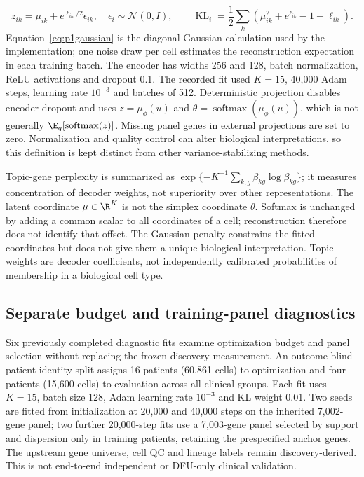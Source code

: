 \documentclass[10pt,a4paper]{article}
\begin{document}
\begin{equation}
z_{ik}=\mu_{ik}+e^{\ell_{ik}/2}\epsilon_{ik},\quad \epsilon_i\sim\mathcal N(0,I),\qquad
\operatorname{KL}_i=\frac12\sum_k\left(\mu_{ik}^2+e^{\ell_{ik}}-1-\ell_{ik}\right).\label{eq:p1gaussian}
\end{equation}
Equation~\eqref{eq:p1gaussian} is the diagonal-Gaussian calculation used by the implementation; one noise draw per cell estimates the reconstruction expectation in each training batch. The encoder has widths 256 and 128, batch normalization, ReLU activations and dropout 0.1. The recorded fit used $K=15$, 40,000 Adam steps, learning rate $10^{-3}$ and batches of 512. Deterministic projection disables encoder dropout and uses $z=\mu_\phi(u)$ and $\theta=\operatorname{softmax}(\mu_\phi(u))$, which is not generally $\E_q[\operatorname{softmax}(z)]$. Missing panel genes in external projections are set to zero. Normalization and quality control can alter biological interpretations, so this definition is kept distinct from other variance-stabilizing methods.

Topic-gene perplexity is summarized as $\exp\{-K^{-1}\sum_{k,g}\beta_{kg}\log\beta_{kg}\}$; it measures concentration of decoder weights, not superiority over other representations. The latent coordinate $\mu\in\R^K$ is not the simplex coordinate $\theta$. Softmax is unchanged by adding a common scalar to all coordinates of a cell; reconstruction therefore does not identify that offset. The Gaussian penalty constrains the fitted coordinates but does not give them a unique biological interpretation. Topic weights are decoder coefficients, not independently calibrated probabilities of membership in a biological cell type.

\subsection{Separate budget and training-panel diagnostics}
Six previously completed diagnostic fits examine optimization budget and panel selection without replacing the frozen discovery measurement. An outcome-blind patient-identity split assigns 16 patients (60,861 cells) to optimization and four patients (15,600 cells) to evaluation across all clinical groups. Each fit uses $K=15$, batch size 128, Adam learning rate $10^{-3}$ and KL weight 0.01. Two seeds are fitted from initialization at 20,000 and 40,000 steps on the inherited 7,002-gene panel; two further 20,000-step fits use a 7,003-gene panel selected by support and dispersion only in training patients, retaining the prespecified anchor genes. The upstream gene universe, cell QC and lineage labels remain discovery-derived. This is not end-to-end independent or DFU-only clinical validation.
\end{document}
